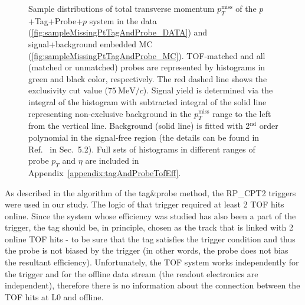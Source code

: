\begin{figure}[b!]
{\begin{subfigure}[b]{\linewidth}
  \end{subfigure}
}\vspace{-5pt}%
\caption[Sample distributions of $p_{T}^{\text{miss}}$ of the $p$+Tag+Probe+$p$ system in the data and embedded MC.]%
    {Sample distributions of total transverse momentum $p_{T}^{\text{miss}}$ of the $p$+Tag+Probe+$p$ system in the data (\ref{fig:sampleMissingPtTagAndProbe_DATA}) and signal+background embedded MC (\ref{fig:sampleMissingPtTagAndProbe_MC}). TOF-matched and all (matched or unmatched) probes are represented by histograms in green and black color, respectively. The red dashed line shows the exclusivity cut value ($75~\text{MeV}/c$). Signal yield is determined via the integral of the histogram with subtracted integral of the solid line representing non-exclusive background in the $p_{T}^{\text{miss}}$ range to the left from the vertical line. Background (solid line) is fitted with 2$^{\text{nd}}$ order polynomial in the signal-free region (the details can be found in Ref.~\cite{AnalysisNoteRafal} in Sec.~5.2). Full sets of histograms in different ranges of probe $p_{T}$ and $\eta$ are included in Appendix~\ref{appendix:tagAndProbeTofEff}.}\label{fig:sampleMissingPtTagAndProbe}%
\end{figure}
\newpage%
%
As described in the algorithm of the tag\&probe method, the RP\_CPT2 triggers were used in our study. The logic of that trigger required at least 2 TOF hits online. Since the system whose efficiency was studied has also been a part of the trigger, the tag should be, in principle, chosen as the track that is linked with 2 online TOF hits - to be sure that the tag satisfies the trigger condition and thus the probe is not biased by the trigger (in other words, the probe does not bias the resultant efficiency). Unfortunately, the TOF system works independently for the trigger and for the offline data stream (the readout electronics are independent), therefore there is no information about the connection between the TOF hits at L0 and offline.
 
